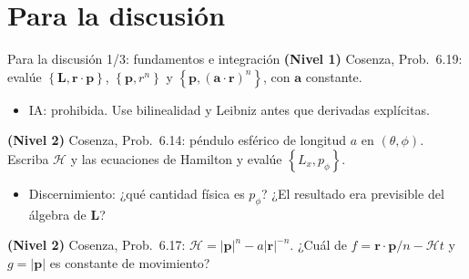 \documentclass[spanish]{beamer}
\newcommand{\Ham}{\mathcal{H}}
\newcommand{\pb}[2]{\left\{#1,#2\right\}}   %
\begin{document}
\section{Para la discusión}

\begin{frame}{Para la discusión 1/3: fundamentos e integración}
\textbf{(Nivel 1)} Cosenza, Prob.~6.19: evalúe $\pb{\mathbf L}{\mathbf r\cdot\mathbf p}$,
$\pb{\mathbf p}{r^n}$ y $\pb{\mathbf p}{(\mathbf a\cdot\mathbf r)^n}$, con $\mathbf a$
constante.
\begin{itemize}
  \item IA: prohibida. Use bilinealidad y Leibniz antes que derivadas explícitas.
\end{itemize}
\vspace{0.2cm}
\textbf{(Nivel 2)} Cosenza, Prob.~6.14: péndulo esférico de longitud $a$ en $(\theta,\phi)$.
Escriba $\Ham$ y las ecuaciones de Hamilton y evalúe $\pb{L_x}{p_\phi}$.
\begin{itemize}
  \item Discernimiento: ¿qué cantidad física es $p_\phi$? ¿El resultado era previsible
        del álgebra de $\mathbf L$?
\end{itemize}
\vspace{0.2cm}
\textbf{(Nivel 2)} Cosenza, Prob.~6.17: $\Ham = |\mathbf p|^n - a|\mathbf r|^{-n}$.
¿Cuál de $f = \mathbf r\cdot\mathbf p/n - \Ham t$ y $g = |\mathbf p|$ es constante de
movimiento?
\end{frame}
\end{document}
